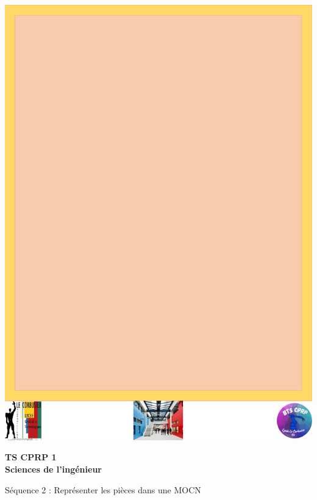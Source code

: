 \documentclass[
	11pt, %
	fleqn, %
	a4paper, %
]{LegrandOrangeBook}
\begin{document}

\titlepage %
	{\includegraphics[width=\paperwidth]{Images/background.pdf}} %
	{ %
		\centering\sffamily %
		{\Huge\bfseries TS CPRP 1 \\ Sciences de l'ingénieur\par} %
		\vspace{16pt} %
		{\LARGE Séquence 2 : Représenter les pièces dans une MOCN\par} %
		\vspace{24pt} %
		{\huge\bfseries \par} %
	}
\end{document}
